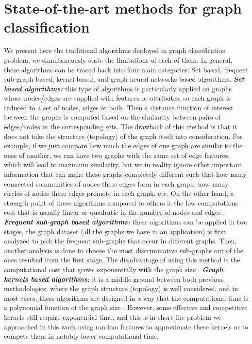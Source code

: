 \section{State-of-the-art methods for graph classification}
We  present here the traditional algorithms deployed in graph classification problem, we simultaneously state the limitations of each of them. In general, these algorithms can be traced back into four main categories: Set based, frequent sub-graph based, kernel based, and graph neural networks based algorithms.\newline 
\textbf{\emph{Set based algorithms:}} this type of algorithms is particularly applied on graphs whose nodes/edges are supplied with features or attributes, so each graph is reduced to  a set of nodes, edges or both. Then a distance function of interest between the graphs is computed  based on the similarity between pairs of edges/nodes in the corresponding sets. The drawback of this method is that it does not take the structure (topology) of the graph itself into consideration. For example, if we just compare how much the edges of one graph are similar to the ones of another, we can have two graphs with the same set of edge features, which will lead to maximum similarity, but we in reality ignore other important information that can make these graphs completely different such that how many connected communities of nodes these edges form in each graph, how many circles of nodes these edges promote in each graph, etc. On the other hand, a strength point of these algorithms  compared to others is the low computations cost that is usually linear or quadratic in the number of nodes and edges \citep{graphlet_kernel}.\newline 
\textbf{\emph{Frequent sub-graph based algorithms:}} these algorithms can be applied in two stages, the graph dataset (all the graphs we have  in an application) is first analyzed to pick the frequent sub-graphs that occur in different graphs. Then, another analysis is done to choose the most discriminative sub-graphs out of the ones resulted from the first stage. The disadvantage of using this method is the computational cost that grows exponentially with the graph size \citep{graphlet_kernel}. \newline
\textbf{\emph{Graph kernels based algorithms:}} it is a middle ground between both previous methodologies, where the graph structure (topology) is well considered, and in most cases, these algorithms are designed in a way that the computational time is a polynomial function of the graph size \citep{graphlet_kernel}. However, some effective and competitive kernels still require exponential time, and this is in short the problem we approached in this work using random features to approximate these kernels or to compete them in notably lower computational time. \newline
